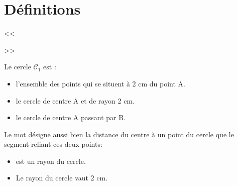 \documentclass[../main.tex]{subfiles}
\begin{document}
    \part{Définitions}


            \begin{exemple}\par\noindent
                \begin{minipage}[c]{.45\linewidth}
                    \begin{center}
                        \exported[scale=1,lmargin=30,vmargins=30,active=1]%
                        <<
                        >>
                    \end{center}
                \end{minipage}\hspace{.08\linewidth}
                \begin{minipage}[c]{.45\linewidth}
                    Le cercle $\mathcal{C}_1$ est :
                    \begin{itemize}
                        \item l'ensemble des points qui se situent
                        à \textsf{2 cm} du point \textsf{A}.
                        \item le cercle de centre \textsf{A} et de
                        rayon \textsf{2 cm}.
                        \item le cercle de centre \textsf{A} passant par \textsf{B}.
                    \end{itemize}
                \end{minipage}
            \end{exemple}
            \begin{remarque}
                Le mot  désigne aussi bien la distance du centre
                à un point du cercle que le segment reliant ces deux points:
                \begin{itemize}
                    \item \relax[\textsf{AB}] est un rayon du cercle.
                    \item Le rayon du cercle vaut 2 cm.
                \end{itemize}
            \end{remarque}
\end{document}
